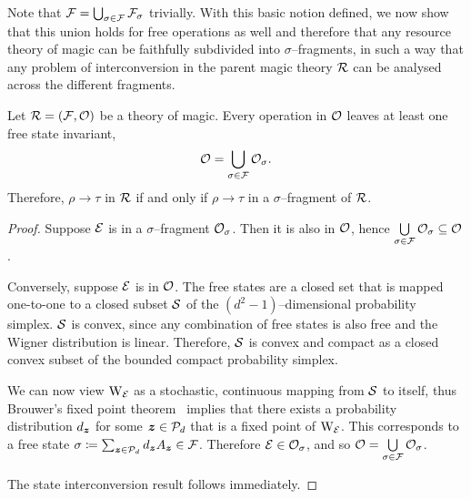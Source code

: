 \documentclass[pra,
aps,
twocolumn,
superscriptaddress,
groupedaddress,
nofootinbib,
reprint
]{revtex4-1}
\begin{document}
Note that $\F = \bigcup_{\sigma \in \F} \F_\sigma$ trivially.
With this basic notion defined, we now show that this union holds for free operations as well and therefore that any resource theory of magic can be faithfully subdivided into $\sigma$--fragments, in such a way that any problem of interconversion in the parent magic theory $\R$ can be analysed across the different fragments.

\begin{theorem}\label{thm:frag}
    Let $\R = (\F, \O)$ be a theory of magic.
    Every operation in $\O$ leaves at least one free state invariant,
  \begin{equation}
\O = \bigcup\limits_{\sigma \in \F} \O_\sigma.
\end{equation}
Therefore, $\rho \longrightarrow \tau$ in $\R$ if and only if $\rho \longrightarrow \tau$ in a $\sigma$--fragment of $\R$.
\end{theorem}
\begin{proof}
    Suppose $\E$ is in a $\sigma$--fragment $\O_\sigma$.
    Then it is also in $\O$, hence $\bigcup\limits_{\sigma \in \F} \O_\sigma \subseteq \O$. 
    
    Conversely, suppose $\E$ is in $\O$. 
    The free states are a closed set that is mapped one-to-one to a closed subset $\cal{S}$ of the $(d^2 - 1)$--dimensional probability simplex.
    $\cal{S}$ is convex, since any combination of free states is also free and the Wigner distribution is linear.
    Therefore, $\cal{S}$ is convex and compact as a closed convex subset of the bounded compact probability simplex.
    
    We can now view $\W{\E}$ as a stochastic, continuous mapping from $\cal{S}$ to itself, thus Brouwer's fixed point theorem~\cite{cit:brouwer} implies that there exists a probability distribution $d_{\bmz}$ for some $ \bmz \in \cal{P}_d$ that is a fixed point of $\W{\E}$.
    This corresponds to a free state $\sigma \coloneqq \sum_{\bmz \in \cal{P}_d} d_{\bmz} A_{\bmz} \in \F$. 
    Therefore $\E \in \O_\sigma$, and so $\O = \bigcup\limits_{\sigma \in \F} \O_\sigma$. 
    
    The state interconversion result follows immediately.
\end{proof}
\end{document}
